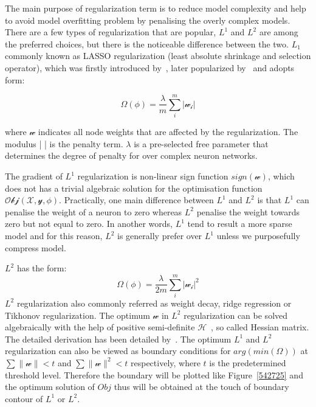
The main purpose of regularization term is to reduce model complexity and help to avoid model overfitting problem by penalising the overly complex models. There are a few types of regularization that are popular, $L^1$ and $L^2$ are among the preferred choices, but there is the noticeable difference between the two. $L_1$ commonly known as LASSO regularization (least absolute shrinkage and selection operator), which was firstly introduced by~\citet{Santosa_1986}, later popularized by~\citet{Tibshirani_1996} and adopts form:

\begin{equation}
   \Omega(\phi) = \frac{\lambda}{m} \sum_i^m | \mathcal{w_i} |
\end{equation}

where $\mathcal{w}$ indicates all node weights that are affected by the regularization. The modulus |  | is the penalty term. $\lambda$ is a pre-selected free parameter that determines the degree of penalty for over complex neuron networks. 
\par 
The gradient of $L^1$ regularization is non-linear sign function $sign (\mathcal{w})$, which does not has a trivial algebraic solution for the optimisation function $\mathcal{Obj}(\mathcal{X},\mathcal{y},\phi)$. Practically, one main difference between $L^1$ and $L^2$ is that $L^1$ can penalise the weight of a neuron to zero whereas $L^2$ penalise the weight towards zero but not equal to zero. In another words, $L^1$ tend to result a more sparse model and for this reason, $L^2$ is generally prefer over $L^1$ unless we purposefully compress model.

$L^2$ has the form:
\begin{equation}
   \Omega(\phi) = \frac{\lambda}{2m} \sum_i^m | \mathcal{w_i} |^2
\end{equation}
$L^2$ regularization also commonly referred as weight decay, ridge regression or Tikhonov regularization. The optimum $\mathcal{w}$ in $L^2$ regularization can be solved algebraically with the help of positive semi-definite $\mathcal{H}$~\cite{Goodfellow-et-al-2016}, so called Hessian matrix. The detailed derivation has been detailed by~\citet{Goodfellow-et-al-2016}. The optimum $L^1$ and $L^2$ regularization can also be viewed as boundary conditions for $arg (min (\Omega)) $ at $\sum \parallel \mathcal{w} \parallel < t $ and  $\sum \parallel \mathcal{w} \parallel^2 < t $ respectively, where $t$ is the predetermined threshold level. Therefore the boundary will be plotted like Figure~\ref{542725} and the optimum solution of $Obj$ thus will be obtained at the touch of boundary contour of $L^1$ or $L^2$. 